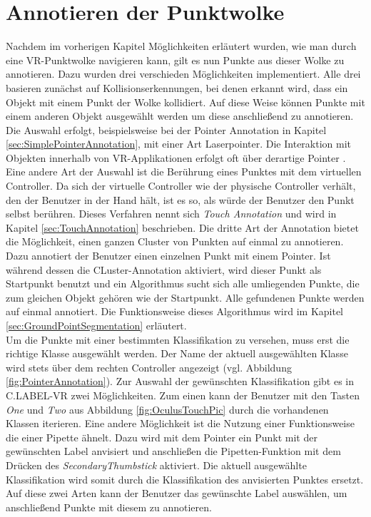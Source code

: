 \section{Annotieren der Punktwolke}
\label{sec:Annotation}
Nachdem im vorherigen Kapitel Möglichkeiten erläutert wurden, wie man durch eine VR-Punktwolke navigieren kann, gilt es nun Punkte aus dieser Wolke zu annotieren. Dazu wurden drei verschieden Möglichkeiten implementiert. Alle drei basieren zunächst auf Kollisionserkennungen, bei denen erkannt wird, dass ein Objekt mit einem Punkt der Wolke kollidiert. Auf diese Weise können Punkte mit einem anderen Objekt ausgewählt werden um diese anschließend zu annotieren. Die Auswahl erfolgt, beispielsweise bei der Pointer Annotation in Kapitel \ref{sec:SimplePointerAnnotation}, mit einer Art Laserpointer. Die Interaktion mit Objekten innerhalb von VR-Applikationen erfolgt oft über derartige Pointer \cite{bib:OftenPointerUse}. Eine andere Art der Auswahl ist die Berührung eines Punktes mit dem virtuellen Controller. Da sich der virtuelle Controller wie der physische Controller verhält, den der Benutzer in der Hand hält, ist es so, als würde der Benutzer den Punkt selbst berühren. Dieses Verfahren nennt sich \textit{Touch Annotation} und wird in Kapitel \ref{sec:TouchAnnotation} beschrieben. Die dritte Art der Annotation bietet die Möglichkeit, einen ganzen Cluster von Punkten auf einmal zu annotieren. Dazu annotiert der Benutzer einen einzelnen Punkt mit einem Pointer. Ist während dessen die CLuster-Annotation aktiviert, wird dieser Punkt als Startpunkt benutzt und ein Algorithmus sucht sich alle umliegenden Punkte, die zum gleichen Objekt gehören wie der Startpunkt. Alle gefundenen Punkte werden auf einmal annotiert. Die Funktionsweise dieses Algorithmus wird im Kapitel \ref{sec:GroundPointSegmentation} erläutert.\\

Um die Punkte mit einer bestimmten Klassifikation zu versehen, muss erst die richtige Klasse ausgewählt werden. Der Name der aktuell ausgewählten Klasse wird stets über dem rechten Controller angezeigt (vgl. Abbildung \ref{fig:PointerAnnotation}). Zur Auswahl der gewünschten Klassifikation gibt es in C.LABEL-VR zwei Möglichkeiten. Zum einen kann der Benutzer mit den Tasten \textit{One} und \textit{Two} aus Abbildung \ref{fig:OculusTouchPic} durch die vorhandenen Klassen iterieren. Eine andere Möglichkeit ist die Nutzung einer Funktionsweise die einer Pipette ähnelt. Dazu wird mit dem Pointer ein Punkt mit der gewünschten Label anvisiert und anschließen die Pipetten-Funktion mit dem Drücken des \textit{SecondaryThumbstick} aktiviert. Die aktuell ausgewählte Klassifikation wird somit durch die Klassifikation des anvisierten Punktes ersetzt. Auf diese zwei Arten kann der Benutzer das gewünschte Label auswählen, um anschließend Punkte mit diesem zu annotieren.

